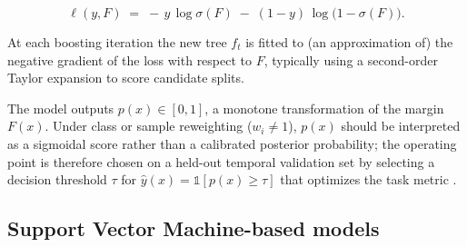 \begin{equation}
\ell(y,F) \;=\; -\,y\,\log \sigma(F)\;-\;(1-y)\,\log\bigl(1-\sigma(F)\bigr).
\label{eq:logistic-loss}
\end{equation}

At each boosting iteration the new tree \(f_t\) is fitted to (an approximation of) the negative gradient of the loss with respect to \(F\), typically using a second-order Taylor expansion to score candidate splits.

The model outputs \(p(x)\in[0,1]\), a monotone transformation of the margin \(F(x)\). Under class or sample reweighting (\(w_i\neq 1\)), \(p(x)\) should be interpreted as a sigmoidal score rather than a calibrated posterior probability; the operating point is therefore chosen on a held-out temporal validation set by selecting a decision threshold \(\tau\) for \(\hat{y}(x)=\mathbb{1}[p(x)\ge\tau]\) that optimizes the task metric \autocite{friedmanGreedyFunctionApproximation2000,chenXGBoostScalableTree2016}.


\subsection{Support Vector Machine-based models}\label{sec:svm}

